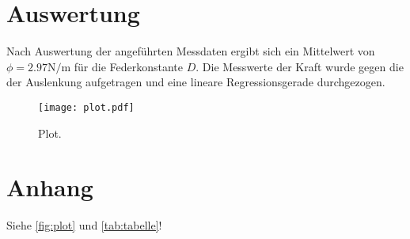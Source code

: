 %

%
\section{Auswertung}
\label{sec:Auswertung}

Nach Auswertung der angeführten Messdaten ergibt sich ein Mittelwert von $\phi = 2.97 \unit{\newton \per \meter}$ für
die Federkonstante $D$.
Die Messwerte der Kraft wurde gegen die der Auslenkung aufgetragen und eine lineare Regressionsgerade durchgezogen.
\begin{figure}
  \centering
  \texttt{[image: plot.pdf]}
  \caption{Plot.}
  \label{fig:plot}
\end{figure}




\section{Anhang}
Siehe \autoref{fig:plot} und \autoref{tab:tabelle}!

%
